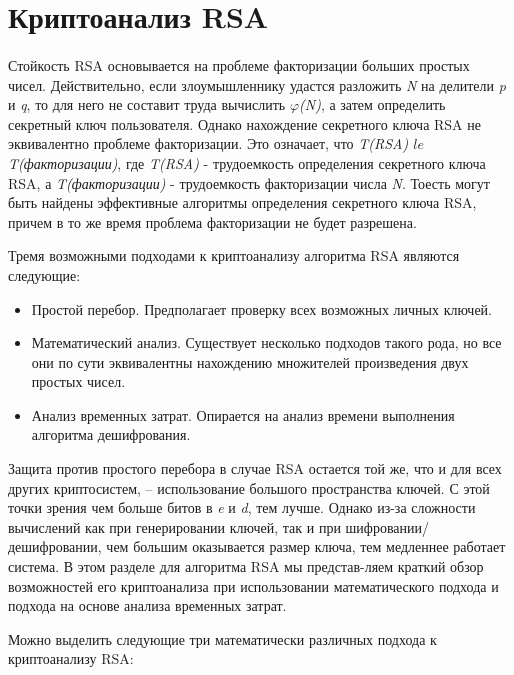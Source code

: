 \section{Криптоанализ RSA}

  \paragraph{} Стойкость RSA основывается на проблеме факторизации больших простых чисел. Действительно, если злоумышленнику удастся разложить
  \textit{N} на делители \textit{p} и \textit{q}, то для него не составит труда вычислить \textit{{$\varphi$}(N)}, а затем определить секретный ключ пользователя. 
  Однако нахождение секретного ключа RSA не эквивалентно проблеме факторизации. Это означает, что \textit{T(RSA) {$le$} T(факторизации)}, 
  где \textit{T(RSA)} - трудоемкость определения секретного ключа RSA, а \textit{T(факторизации)} - трудоемкость факторизации числа \textit{N}. Тоесть 
  могут быть найдены эффективные алгоритмы определения секретного ключа RSA, причем в то же время проблема факторизации не будет разрешена.
  
  Тремя возможными подходами к криптоанализу алгоритма RSA являются следующие:
  
    \begin{itemize}
     \item Простой перебор. Предполагает проверку всех возможных личных ключей.
     \item Математический анализ. Существует несколько подходов такого рода, но все они по сути эквивалентны нахождению множителей произведения 
     двух простых чисел.
     \item Анализ временных затрат. Опирается на анализ времени выполнения алгоритма дешифрования.
    \end{itemize}
    
  Защита против простого перебора в случае RSA остается той же, что и для всех других криптосистем, – использование большого пространства 
  ключей. С этой точки зрения чем больше битов в \textit{e} и \textit{d}, тем лучше. Однако из-за сложности вычислений как при генерировании 
  ключей, так и при шифровании/дешифровании, чем большим оказывается размер ключа, тем медленнее работает система. В этом разделе для 
  алгоритма RSA мы представ-ляем краткий обзор возможностей его криптоанализа при использовании математического подхода и подхода на основе 
  анализа временных затрат.
  
  Можно выделить следующие три математически различных подхода к криптоанализу RSA:
  
